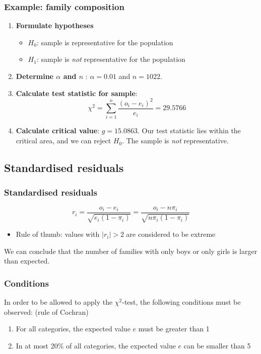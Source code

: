 \documentclass{beamer}
\begin{document}
\begin{frame}
  \frametitle{Example: family composition}
  \begin{enumerate}
  \item \textbf{Formulate hypotheses}
    \begin{itemize}
      \item $H_{0}$: sample is representative for the population
      \item $H_{1}$: sample is \emph{not} representative for the population
    \end{itemize}
  \item \textbf{Determine $\alpha$ and $n$} : $\alpha = 0.01$ and $n = 1022$.
  \item \textbf{Calculate test statistic for sample}:
  \[ \chi^{2} = \sum_{i=1}^{n} \frac{(o_{i} - e_{i})^{2}}{e_{i}} = 29.5766 \]
  \item \textbf{Calculate critical value}: $g = 15.0863$. Our test statistic lies within the critical area, and we can reject $H_{0}$. The sample is \emph{not} representative.
\end{enumerate}
\end{frame}

\subsection{Standardised residuals}
\begin{frame}
  \frametitle{Standardised residuals}
  \[ r_{i} = \frac{o_{i} - e_{i}}{\sqrt{e_{i}(1-\pi_{i})}} = \frac{o_{i} - n \pi_{i}}{\sqrt{n \pi_{i}(1-\pi_{i})}} \]

  \begin{itemize}
    \item Rule of thumb: values with $|r_i| > 2$ are considered to be extreme
  \end{itemize}

  We can conclude that the number of families with only boys or only girls is larger than expected.
\end{frame}

\begin{frame}
  \frametitle{Conditions}
  
  In order to be allowed to apply the $\chi^2$-test, the following conditions must be observed: (rule of Cochran)
  \begin{enumerate}
    \item For all categories, the expected value $e$ must be greater than 1
    \item In at most 20\% of all categories, the expected value $e$ can be smaller than 5
  \end{enumerate}
\end{frame}
\end{document}
